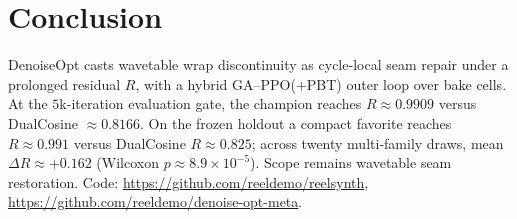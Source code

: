 \section{Conclusion}
\label{sec:conclusion}

DenoiseOpt casts wavetable wrap discontinuity as cycle-local seam repair under a prolonged residual $R$, with a hybrid GA--PPO(+PBT) outer loop over bake cells.
At the $5$k-iteration evaluation gate, the champion reaches $R\approx 0.9909$ versus DualCosine $\approx 0.8166$.
On the frozen holdout a compact favorite reaches $R\approx 0.991$ versus DualCosine $R\approx 0.825$; across twenty multi-family draws, mean $\Delta R\approx{+}0.162$ (Wilcoxon $p\approx 8.9{\times}10^{-5}$).
Scope remains wavetable seam restoration.
Code: \url{https://github.com/reeldemo/reelsynth}, \url{https://github.com/reeldemo/denoise-opt-meta}.
